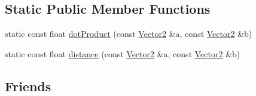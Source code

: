 \subsection*{Static Public Member Functions}
\begin{DoxyCompactItemize}
\item 
static const float \hyperlink{classprism_1_1_vector2_ab98244c887669d29c05fb895242d9a1f}{dot\+Product} (const \hyperlink{classprism_1_1_vector2}{Vector2} \&a, const \hyperlink{classprism_1_1_vector2}{Vector2} \&b)
\item 
static const float \hyperlink{classprism_1_1_vector2_a790da8a1d2109d70137f09182e8da55e}{distance} (const \hyperlink{classprism_1_1_vector2}{Vector2} \&a, const \hyperlink{classprism_1_1_vector2}{Vector2} \&b)
\end{DoxyCompactItemize}
\subsection*{Friends}
